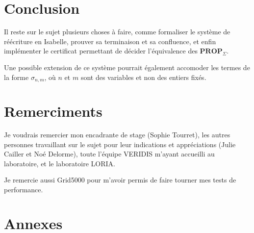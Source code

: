 \documentclass[12pt, a4paper]{article}
\def\prop#1{ \mathbf{PROP}_{ #1 } }
\begin{document}
\section{Conclusion}

Il reste sur le sujet plusieurs choses à faire, comme formaliser le système de réécriture en Isabelle, prouver sa terminaison et sa confluence, et enfin implémenter le certificat permettant de décider l'équivalence des $\prop{\Sigma}$.

Une possible extension de ce système pourrait également accomoder les termes de la forme $\sigma_{n,m}$, où $n$ et $m$ sont des variables et non des entiers fixés.

\section{Remerciments}

Je voudrais remercier mon encadrante de stage (Sophie Tourret), les autres personnes travaillant sur le sujet pour leur indications et appréciations (Julie Cailler et Noé Delorme), toute l'équipe VERIDIS m'ayant accueilli au laboratoire, et le laboratoire LORIA.

Je remercie aussi Grid5000 pour m'avoir permis de faire tourner mes tests de performance.






\newpage

\section{Annexes}
\end{document}
